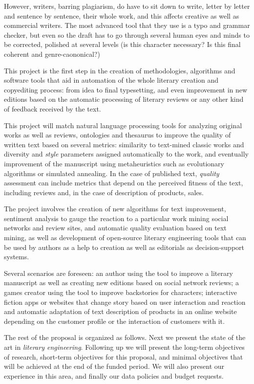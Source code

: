 \documentclass[a4paper,12pt,twocolumn]{article}
\begin{document}
However, writers, barring plagiarism, do have to sit down to write,
letter by letter and sentence by sentence, their whole work, and this
affects creative as well as commercial writers. The most advanced tool
that they use is a typo and grammar checker, but even so the draft has
to go through several human eyes and minds to be corrected, polished
at several levels (is this character necessary? Is this final coherent
and genre-caononical?)

This project is the first step in the creation of methodologies, algorithms and
software tools that aid in automation of the whole literary creation and
copyediting process: from idea to final typesetting, and even improvement in new editions
based on the automatic processing of literary reviews or any other
kind of feedback received by the text.

This project will match natural language processing tools for
analyzing original works as well as reviews, ontologies and thesaurus
to improve the quality of written text based on several metrics: similarity to
text-mined classic works and diversity and {\em style} parameters
assigned automatically to the work, and eventually improvement of the
manuscript using metaheuristics such as evolutionary algorithms or
simulated annealing. In the case of published text, {\em quality}
assessment can include metrics that depend on the perceived fitness of
the text, including reviews and, in the case of description of
products, sales.

The project involves the creation of new algorithms for text
improvement, sentiment analysis to gauge the reaction to a particular
work mining social networks and review sites, and automatic quality
evaluation based on text mining, as well as development of open-source
literary engineering tools that can be used by authors as a help to
creation as well as editorials as decision-support systems.  

Several scenarios are foreseen: an author using the tool to improve a
literary manuscript as well as creating new editions based on social
network reviews; a games creator using the tool to improve backstories
for characters; interactive fiction apps or websites that change story
based on user interaction and reaction and automatic adaptation of
text description of products in an online website depending on the
customer profile or the interaction of customers with it. 

The rest of the proposal is organized as follows. Next we present the
state of the art in {\em literary engineering}. Following up we will
present the long-term objectives of research, short-term objectives
for this proposal, and minimal objectives that will be achieved at the
end of the funded period. We will also present our experience in this
area, and finally our data policies and budget requests.
\end{document}
